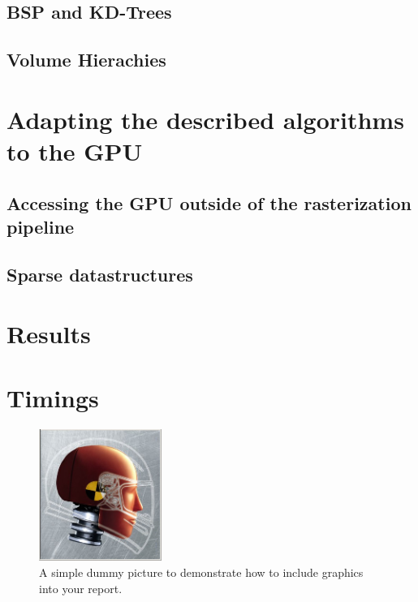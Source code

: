 \documentclass{ACGSeminar}
\begin{document}
\subsection{BSP and KD-Trees}
\subsection{Volume Hierachies}

\section{Adapting the described algorithms to the GPU}
\subsection{Accessing the GPU outside of the rasterization pipeline}
\subsection{Sparse datastructures}

\section{Results}
\section{Timings}

\begin{figure}[htb!]
  \begin{centering}
    \includegraphics[width=4cm]{figures/dummy.jpg}\par
  \end{centering}
  \caption{A simple dummy picture to demonstrate how
           to include graphics into your report.}
  \label{fig:dummy}
\end{figure}


\printbibliography
\cleardoublepage
\end{document}
